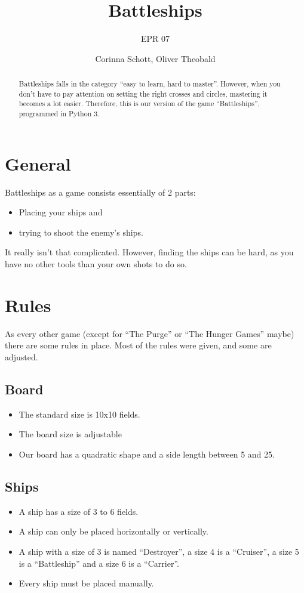 \documentclass[12pt]{scrartcl}
\author{Corinna Schott, Oliver Theobald}
\title{Battleships}
\subtitle{EPR 07}
\begin{document}
	\maketitle
	\begin{abstract}
		Battleships falls in the category \enquote{easy to learn, hard to master}.
		However, when you don't have to pay attention on setting the right crosses and circles, mastering it becomes a lot easier.
		Therefore, this is our version of the game \enquote{Battleships}, programmed in Python 3.
	\end{abstract}
	\tableofcontents
	\clearpage


	\section{General}\label{sec:general}
	Battleships as a game consists essentially of 2 parts:
	\begin{itemize}
		\item Placing your ships and
		\item trying to shoot the enemy's ships.
	\end{itemize}

	It really isn't that complicated. However, finding the ships can be hard, as you have no other tools than your own shots to do so.
	\clearpage


	\section{Rules}\label{sec:rules}
	As every other game (except for \enquote{The Purge} or \enquote{The Hunger Games} maybe) there are some rules in place. Most of the rules were given, and some are adjusted.

	\subsection{Board}\label{sec:board}
	\begin{itemize}
		\item The standard size is 10x10 fields.
		\item The board size is adjustable

		\item Our board has a quadratic shape and a side length between 5 and 25.
	\end{itemize}

	\subsection{Ships}
	\begin{itemize}
		\item A ship has a size of 3 to 6 fields.
		\item A ship can only be placed horizontally or vertically.
		\item A ship with a size of 3 is named \enquote{Destroyer}, a size 4 is a \enquote{Cruiser}, a size 5 is a \enquote{Battleship} and a size 6 is a \enquote{Carrier}.
		\item Every ship must be placed manually.
	\end{itemize}
\end{document}
